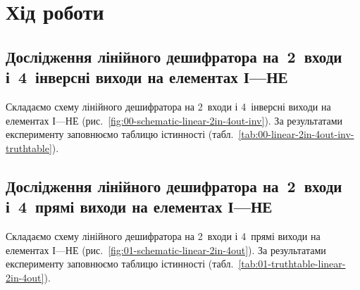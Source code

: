 \documentclass[a4paper,oneside,DIV=12,12pt,headings=normal]{scrartcl}
\begin{document}
	\section{Хід роботи}
		\subsection{Дослідження лінійного дешифратора на~2~входи і~4~інверсні виходи на елементах І—НЕ}
			Складаємо схему лінійного дешифратора на 2~входи і 4~інверсні виходи на елементах І—НЕ (рис.~\ref{fig:00-schematic-linear-2in-4out-inv}). За результатами експерименту заповнюємо таблицю істинності (табл.~\ref{tab:00-linear-2in-4out-inv-truthtable}).
			
			\begin{figure}[!htbp]
				\begin{floatrow}
				\end{floatrow}
			\end{figure}
		
		\subsection{Дослідження лінійного дешифратора на~2~входи і~4~прямі виходи на елементах І—НЕ}
			Складаємо схему лінійного дешифратора на 2~входи і 4~прямі виходи на елементах І—НЕ (рис.~\ref{fig:01-schematic-linear-2in-4out}). За результатами експерименту заповнюємо таблицю істинності (табл.~\ref{tab:01-truthtable-linear-2in-4out}).
			
\end{document}
